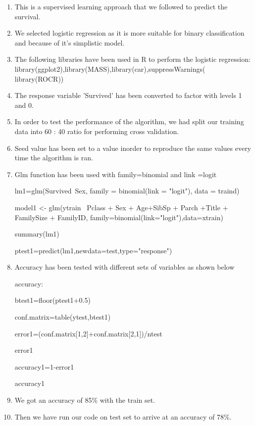 \begin{enumerate}

\item This is a supervised learning approach that we followed to predict the survival.

\item We selected logistic regression as it is more suitable for binary classification and because of it's simplistic model.
\item The following libraries have been used in R to perform the logistic regression: library(ggplot2),library(MASS),library(car),suppressWarnings( library(ROCR))

\item The response variable 'Survived' has been converted to factor with levels 1 and 0.

\item In order to test the performance of the algorithm, we had split our training data into 60 : 40 ratio for performing cross validation.

\item Seed value has been set to a value inorder to reproduce the same values every time the algorithm is ran.

\item Glm function has been used with family=binomial and link =logit

lm1=glm(Survived~Sex, family = binomial(link = "logit"), data = traind)

model1 <- glm(ytrain ~Pclass + Sex + Age+SibSp + Parch +Title + FamilySize + FamilyID, family=binomial(link="logit"),data=xtrain)

summary(lm1)

ptest1=predict(lm1,newdata=test,type="response")

\item Accuracy has been tested with different sets of variables as shown below

accuracy:

btest1=floor(ptest1+0.5)

conf.matrix=table(ytest,btest1)

error1=(conf.matrix[1,2]+conf.matrix[2,1])/ntest

error1

accuracy1=1-error1

accuracy1


\item We got an accuracy of 85\% with the train set.

\item Then we have run our code on test set to arrive at an accuracy of 78\%.
\end{enumerate}
